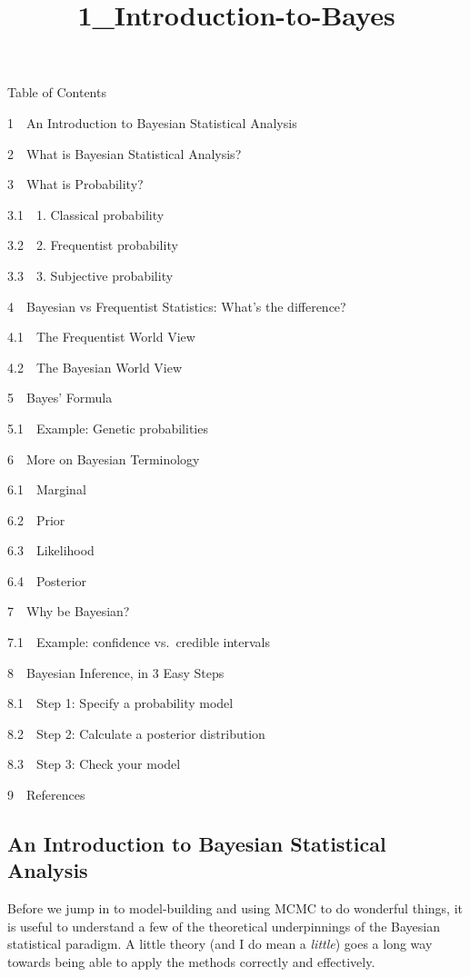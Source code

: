 \documentclass[11pt]{article}
\title{1\_Introduction-to-Bayes}
\begin{document}
    
    
    \maketitle
    
    

    
    Table of Contents{}

{{1~~}An Introduction to Bayesian Statistical Analysis}

{{2~~}What is Bayesian Statistical Analysis?}

{{3~~}What is Probability?}

{{3.1~~}1. Classical probability}

{{3.2~~}2. Frequentist probability}

{{3.3~~}3. Subjective probability}

{{4~~}Bayesian vs Frequentist Statistics: What's the difference?}

{{4.1~~}The Frequentist World View}

{{4.2~~}The Bayesian World View}

{{5~~}Bayes' Formula}

{{5.1~~}Example: Genetic probabilities}

{{6~~}More on Bayesian Terminology}

{{6.1~~}Marginal}

{{6.2~~}Prior}

{{6.3~~}Likelihood}

{{6.4~~}Posterior}

{{7~~}Why be Bayesian?}

{{7.1~~}Example: confidence vs.~credible intervals}

{{8~~}Bayesian Inference, in 3 Easy Steps}

{{8.1~~}Step 1: Specify a probability model}

{{8.2~~}Step 2: Calculate a posterior distribution}

{{8.3~~}Step 3: Check your model}

{{9~~}References}

    \hypertarget{an-introduction-to-bayesian-statistical-analysis}{%
\subsection{An Introduction to Bayesian Statistical
Analysis}\label{an-introduction-to-bayesian-statistical-analysis}}

    Before we jump in to model-building and using MCMC to do wonderful
things, it is useful to understand a few of the theoretical
underpinnings of the Bayesian statistical paradigm. A little theory (and
I do mean a \emph{little}) goes a long way towards being able to apply
the methods correctly and effectively.
\end{document}
